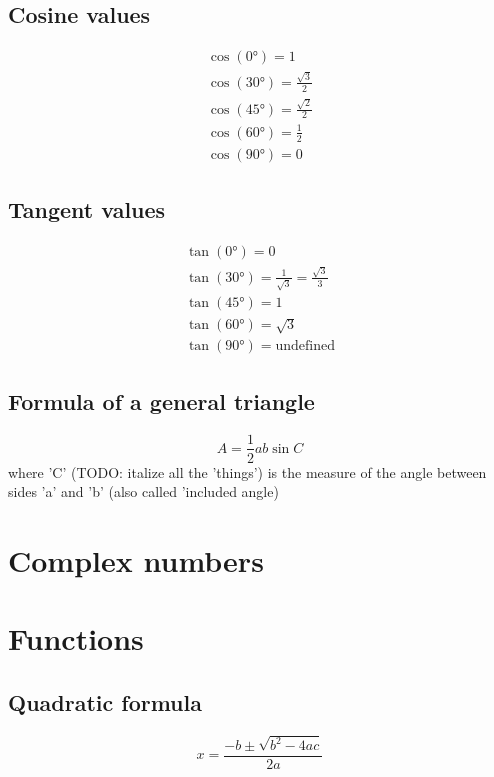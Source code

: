 \documentclass{article}
\begin{document}
\subsection{Cosine values}
\begin{equation}
  \begin{gathered}
    \cos(0°) = 1 \\
    \cos(30°) = \frac{\sqrt{3}}{2} \\
    \cos(45°) = \frac{\sqrt{2}}{2} \\
    \cos(60°) = \frac{1}{2} \\
    \cos(90°) = 0
  \end{gathered}
\end{equation}


\subsection{Tangent values}
\begin{equation}
  \begin{gathered}
    \tan(0°) = 0 \\
    \tan(30°) = \frac{1}{\sqrt{3}} = \frac{\sqrt{3}}{3} \\
    \tan(45°) = 1 \\
    \tan(60°) = \sqrt{3} \\
    \tan(90°) = \text{undefined}
  \end{gathered}
\end{equation}

\subsection{Formula of a general triangle}

\begin{equation}
  A = \frac{1}{2}ab \sin{C}
\end{equation}
where 'C' (TODO: italize all the 'things') is the measure of the angle between sides 'a' and 'b' (also called 'included angle)

\section{Complex numbers}
\section{Functions}
\subsection{Quadratic formula}
\begin{equation}
  x = \frac{-b \pm \sqrt{b^2 - 4ac}}{2a}
\end{equation}
\end{document}
